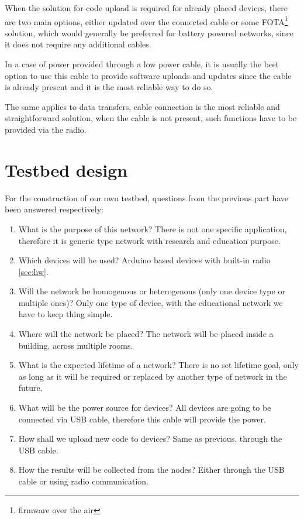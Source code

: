 \documentclass[
  print, %
  table,   %
  nolof,     %
  nolot,     %
           oneside
]{fithesis3}
\begin{document}
  When the solution for code upload is required for already placed devices, there are two main options, either updated over the connected cable or some FOTA\footnote{firmware over the air} solution, which would generally be preferred for battery powered networks, since it does not require any additional cables.

  In a case of power provided through a low power cable, it is usually the best option to use this cable to provide software uploads and updates since the cable is already present and it is the most reliable way to do so.

  The same applies to data transfers, cable connection is the most reliable and straightforward solution, when the cable is not present, such functions have to be provided via the radio.

  \section{Testbed design}
  For the construction of our own testbed, questions from the previous part have been answered respectively:
  \begin{enumerate}

    \item What is the purpose of this network? There is not one specific application, therefore it is generic type network with research and education purpose.
    \item Which devices will be used? Arduino based devices with built-in radio \ref{sec:hw}.
    \item Will the network be homogenous or heterogenous (only one device type or multiple ones)? Only one type of device, with the educational network we have to keep thing simple.
    \item Where will the network be placed? The network will be placed inside a building, across multiple rooms.
    \item What is the expected lifetime of a network? There is no set lifetime goal, only as long as it will be required or replaced by another type of network in the future.
    \item What will be the power source for devices? All devices are going to be connected via USB cable, therefore this cable will provide the power.
    \item How shall we upload new code to devices? Same as previous, through the USB cable.
    \item How the results will be collected from the nodes? Either through the USB cable or using radio communication.

  \end{enumerate}
\end{document}
